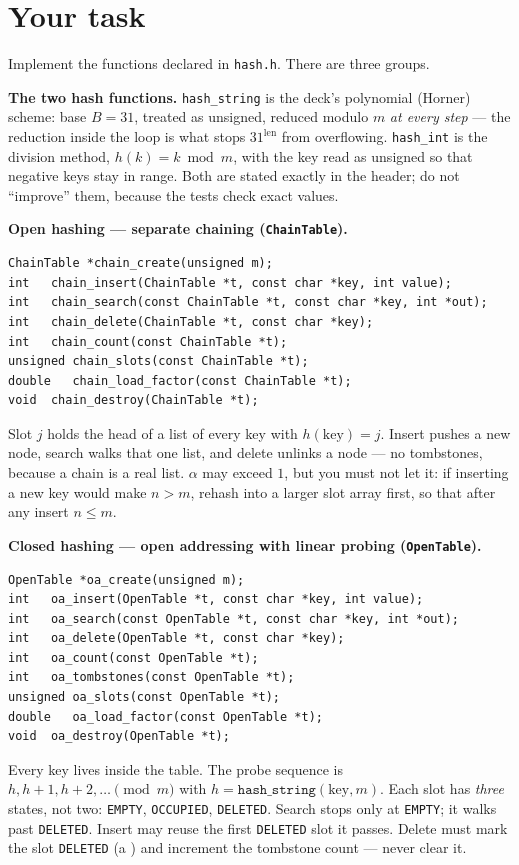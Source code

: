 \documentclass[11pt]{article}
\begin{document}
\section{Your task}

Implement the functions declared in \texttt{hash.h}. There are three groups.

\textbf{The two hash functions.} \texttt{hash\_string} is the deck's polynomial (Horner) scheme: base $B = 31$, treated as unsigned, reduced modulo $m$ \emph{at every step} --- the reduction inside the loop is what stops $31^{\text{len}}$ from overflowing. \texttt{hash\_int} is the division method, $h(k) = k \bmod m$, with the key read as unsigned so that negative keys stay in range. Both are stated exactly in the header; do not ``improve'' them, because the tests check exact values.

\textbf{Open hashing --- separate chaining (\texttt{ChainTable}).}
\begin{verbatim}
ChainTable *chain_create(unsigned m);
int   chain_insert(ChainTable *t, const char *key, int value);
int   chain_search(const ChainTable *t, const char *key, int *out);
int   chain_delete(ChainTable *t, const char *key);
int   chain_count(const ChainTable *t);
unsigned chain_slots(const ChainTable *t);
double   chain_load_factor(const ChainTable *t);
void  chain_destroy(ChainTable *t);
\end{verbatim}
Slot $j$ holds the head of a list of every key with $h(\text{key}) = j$. Insert pushes a new node, search walks that one list, and delete unlinks a node --- no tombstones, because a chain is a real list. $\alpha$ may exceed $1$, but you must not let it: if inserting a new key would make $n > m$, rehash into a larger slot array first, so that after any insert $n \le m$.

\textbf{Closed hashing --- open addressing with linear probing (\texttt{OpenTable}).}
\begin{verbatim}
OpenTable *oa_create(unsigned m);
int   oa_insert(OpenTable *t, const char *key, int value);
int   oa_search(const OpenTable *t, const char *key, int *out);
int   oa_delete(OpenTable *t, const char *key);
int   oa_count(const OpenTable *t);
int   oa_tombstones(const OpenTable *t);
unsigned oa_slots(const OpenTable *t);
double   oa_load_factor(const OpenTable *t);
void  oa_destroy(OpenTable *t);
\end{verbatim}
Every key lives inside the table. The probe sequence is $h, h+1, h+2, \dots \pmod m$ with $h = \texttt{hash\_string}(\text{key}, m)$. Each slot has \emph{three} states, not two: \texttt{EMPTY}, \texttt{OCCUPIED}, \texttt{DELETED}. Search stops only at \texttt{EMPTY}; it walks past \texttt{DELETED}. Insert may reuse the first \texttt{DELETED} slot it passes. Delete must mark the slot \texttt{DELETED} (a ) and increment the tombstone count --- never clear it.
\end{document}
